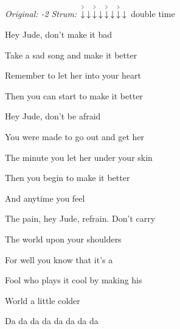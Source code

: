 \begin{song}


\begin{headerbox}
\textit{Original: -2} \quad
\textit{Strum:} $\AccentDown\Down\AccentDown\Down\AccentDown\Down\AccentDown\Down$ double time
\end{headerbox}

\begin{hchordbox}
\end{hchordbox}

\bigskip

Hey Jude, don’t make it bad \par
Take a sad song and make it better \par
Remember to let her into your heart \par
Then you can start to make it better \par

\bigskip

Hey Jude, don’t be afraid \par
You were made to go out and get her \par
The minute you let her under your skin \par
Then you begin to make it better \par

\bigskip

 And anytime you feel \par
The pain, hey Jude, refrain. Don’t carry \par
The world upon your shoulders \par
{} For well you know that it's a \par
{}Fool who plays it cool by making his \par
{}World a little colder \par

\bigskip

Da da da da da da da da \par


\end{song}
